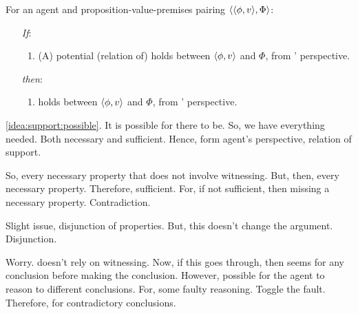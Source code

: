 \begin{note}
  \begin{proposition}
    \label{prop:pot-support-onlyIf-support}
    For an agent \vAgent{} and proposition-value-premises pairing \(\langle \langle \phi, v \rangle, \Phi \rangle\):
    \begin{enumerate}
    \item[\emph{If}:]
      \begin{enumerate}[label=\alph*., ref=(\alph*.)]
      \item
        (A) potential (relation of) \support{} holds between \(\langle \phi, v \rangle\) and \(\Phi\), from \vAgent{}' perspective.
      \end{enumerate}
    \item[\emph{then}:]
      \begin{enumerate}[label=\alph*., ref=(\alph*.), resume]
      \item
         holds between \(\langle \phi, v \rangle\) and \(\Phi\), from \vAgent{}' perspective.
      \end{enumerate}
    \end{enumerate}
    \vspace{-\baselineskip}
  \end{proposition}

  \begin{argument}
    \autoref{idea:support:possible}.
    It is possible for there to be.
    So, we have everything needed.
    Both necessary and sufficient.
    Hence, form agent's perspective, relation of support.

    So, every necessary property that does not involve witnessing.
    But, then, every necessary property.
    Therefore, sufficient.
    For, if not sufficient, then missing a necessary property.
    Contradiction.

    Slight issue, disjunction of properties.
    But, this doesn't change the argument.
    Disjunction.
  \end{argument}
\end{note}

\begin{note}
  \color{red}
  Worry.
   doesn't rely on witnessing.
  Now, if this goes through, then seems \support{} for any conclusion before making the conclusion.
  However, possible for the agent to reason to different conclusions.
  For, some faulty reasoning.
  Toggle the fault.
  Therefore, \support{} for contradictory conclusions.
\end{note}

